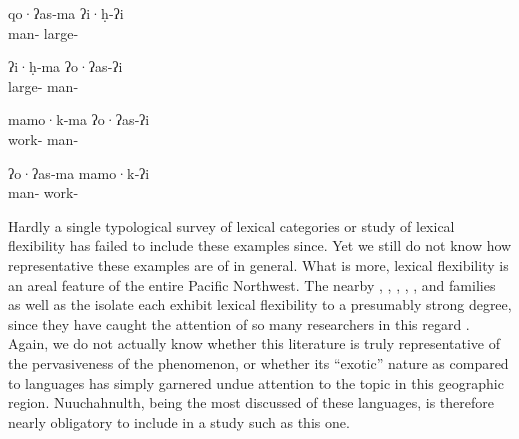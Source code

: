 \begin{exe}

  \ex\label{ex:1.8}
  \begin{xlist}

    \ex
    \gll qo·ʔas‑ma        ʔi·ḥ‑ʔi\\
         man‑ large‑\\

    \ex
    \gll ʔi·ḥ‑ma            ʔo·ʔas‑ʔi\\
         large‑ man‑\\

  \end{xlist}

  \ex\label{ex:1.9}
  \begin{xlist}

    \ex
    \gll mamo·k‑ma         ʔo·ʔas‑ʔi\\
         work‑ man‑\\

    \ex
    \gll ʔo·ʔas‑ma        mamo·k‑ʔi\\
         man‑ work‑\\

  \end{xlist}

\end{exe}

Hardly a single typological survey of lexical categories or study of lexical flexibility has failed to include these examples since. Yet we still do not know how representative these examples are of  in general. What is more, lexical flexibility is an areal feature of the entire Pacific Northwest. The nearby , , , , , and  families as well as the isolate  each exhibit lexical flexibility to a presumably strong degree, since they have caught the attention of so many researchers in this regard . Again, we do not actually know whether this literature is truly representative of the pervasiveness of the phenomenon, or whether its \enquote{exotic} nature as compared to  languages has simply garnered undue attention to the topic in this geographic region. Nuuchahnulth, being the most discussed of these languages, is therefore nearly obligatory to include in a study such as this one.

